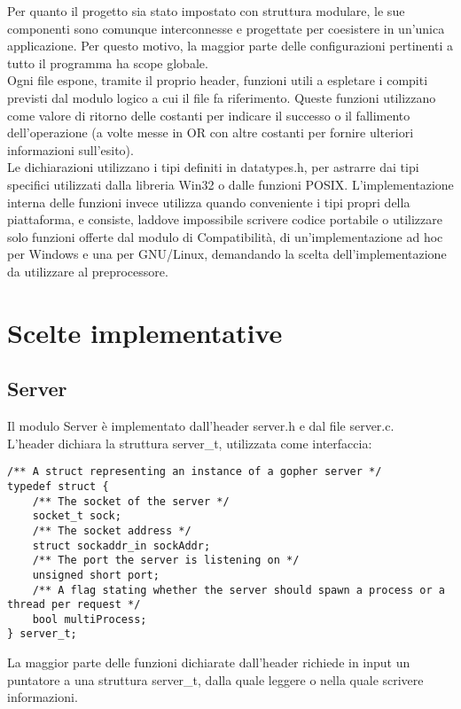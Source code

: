 \documentclass{article}
\begin{document}
Per quanto il progetto sia stato impostato con struttura modulare, le sue componenti sono 
comunque interconnesse e progettate per coesistere in un'unica applicazione. 
Per questo motivo, la maggior parte delle configurazioni pertinenti a tutto il programma ha scope globale.\\
Ogni file espone, tramite il proprio header, funzioni utili a espletare
i compiti previsti dal modulo logico a cui il file fa riferimento. Queste funzioni
utilizzano come valore di ritorno delle costanti per indicare il successo o il fallimento dell'operazione (a volte
messe in OR con altre costanti per fornire ulteriori informazioni sull'esito).
\\Le dichiarazioni utilizzano i tipi definiti in datatypes.h, per astrarre dai tipi specifici utilizzati
dalla libreria Win32 o dalle funzioni POSIX. L'implementazione interna delle funzioni invece
 utilizza quando conveniente i tipi propri della piattaforma, e consiste, laddove impossibile scrivere codice portabile o utilizzare solo funzioni offerte dal 
modulo di Compatibilità, di un'implementazione ad hoc per Windows e una per GNU/Linux, demandando la scelta dell'implementazione
da utilizzare al preprocessore.

\section{Scelte implementative}

\subsection{Server}
Il modulo Server è implementato dall'header server.h e dal file server.c.\\
L'header dichiara la struttura server\_t, utilizzata come interfaccia:
\begin{lstlisting}
/** A struct representing an instance of a gopher server */
typedef struct {
    /** The socket of the server */
    socket_t sock;
    /** The socket address */
    struct sockaddr_in sockAddr;
    /** The port the server is listening on */
    unsigned short port;
    /** A flag stating whether the server should spawn a process or a thread per request */
    bool multiProcess;
} server_t;
\end{lstlisting}
La maggior parte delle funzioni dichiarate dall'header richiede in input
un puntatore a una struttura server\_t, dalla quale leggere o nella quale scrivere informazioni.\\
\end{document}
